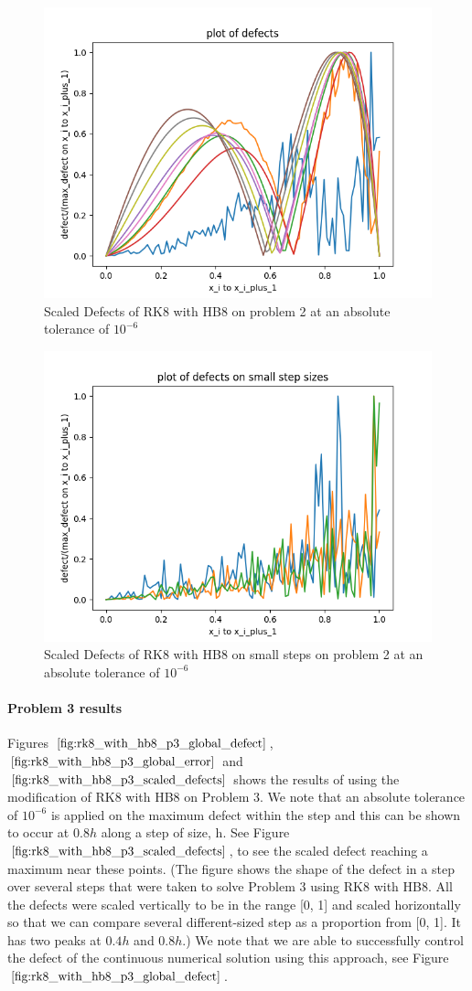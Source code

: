 \documentclass{article}
\begin{document}
\begin{figure}[H]
\centering
\includegraphics[width=0.7\linewidth]{./figures/rk8_with_hb8_p2_scaled_defects}
\caption{Scaled Defects of RK8 with HB8 on problem 2 at an absolute tolerance of $10^{-6}$}
\label{fig:rk8_with_hb8_p2_scaled_defects}
\end{figure}

\begin{figure}[H]
\centering
\includegraphics[width=0.7\linewidth]{./figures/rk8_with_hb8_p2_scaled_defects_small_steps}
\caption{Scaled Defects of RK8 with HB8 on small steps on problem 2 at an absolute tolerance of $10^{-6}$}
\label{fig:rk8_with_hb8_p2_scaled_defects_small_steps}
\end{figure}

\paragraph{Problem 3 results}
Figures $\ref{fig:rk8_with_hb8_p3_global_defect}$, $\ref{fig:rk8_with_hb8_p3_global_error}$ and $\ref{fig:rk8_with_hb8_p3_scaled_defects}$ shows the results of using the modification of RK8 with HB8 on Problem 3. 
We note that an absolute tolerance of $10^{-6}$ is applied on the maximum defect within the step and this can be shown to occur at $0.8h$ along a step of size, h. See Figure $\ref{fig:rk8_with_hb8_p3_scaled_defects}$, to see the scaled defect reaching a maximum near these points. (The figure shows the shape of the defect in a step over several steps that were taken to solve Problem 3 using RK8 with HB8. All the defects were scaled vertically to be in the range [0, 1] and scaled horizontally so that we can compare several different-sized step as a proportion from [0, 1]. It has two peaks at $0.4h$ and $0.8h$.) We note that we are able to successfully control the defect of the continuous numerical solution using this approach, see Figure $\ref{fig:rk8_with_hb8_p3_global_defect}$. 
\end{document}
